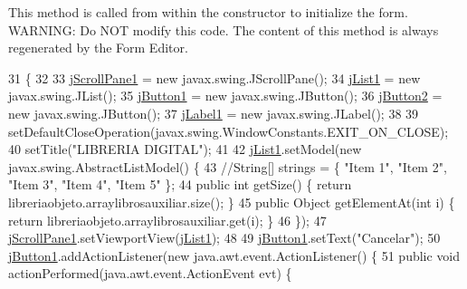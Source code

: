 This method is called from within the constructor to initialize the form. W\+A\+R\+N\+I\+NG\+: Do N\+OT modify this code. The content of this method is always regenerated by the Form Editor. 
\begin{DoxyCode}
31                                   \{
32 
33         \mbox{\hyperlink{class_interfaz_package_1_1_busqueda_libro_a2c5f99da1566043c6ead6bf6bc702bfa}{jScrollPane1}} = \textcolor{keyword}{new} javax.swing.JScrollPane();
34         \mbox{\hyperlink{class_interfaz_package_1_1_busqueda_libro_a44542e61409368d4f638e77765ab785f}{jList1}} = \textcolor{keyword}{new} javax.swing.JList();
35         \mbox{\hyperlink{class_interfaz_package_1_1_busqueda_libro_a8bd603a21b300bd0b31210ae9756c361}{jButton1}} = \textcolor{keyword}{new} javax.swing.JButton();
36         \mbox{\hyperlink{class_interfaz_package_1_1_busqueda_libro_a1cb7663746354ace608d7846c3d86105}{jButton2}} = \textcolor{keyword}{new} javax.swing.JButton();
37         \mbox{\hyperlink{class_interfaz_package_1_1_busqueda_libro_ae9603cba787d7c8cd78d9a35ac7c31ab}{jLabel1}} = \textcolor{keyword}{new} javax.swing.JLabel();
38 
39         setDefaultCloseOperation(javax.swing.WindowConstants.EXIT\_ON\_CLOSE);
40         setTitle(\textcolor{stringliteral}{"LIBRERIA DIGITAL"});
41 
42         \mbox{\hyperlink{class_interfaz_package_1_1_busqueda_libro_a44542e61409368d4f638e77765ab785f}{jList1}}.setModel(\textcolor{keyword}{new} javax.swing.AbstractListModel() \{
43             \textcolor{comment}{//String[] strings = \{ "Item 1", "Item 2", "Item 3", "Item 4", "Item 5" \};}
44             \textcolor{keyword}{public} \textcolor{keywordtype}{int} getSize() \{ \textcolor{keywordflow}{return} libreriaobjeto.arraylibrosauxiliar.size(); \}
45             \textcolor{keyword}{public} Object getElementAt(\textcolor{keywordtype}{int} i) \{ \textcolor{keywordflow}{return} libreriaobjeto.arraylibrosauxiliar.get(i); \}
46         \});
47         \mbox{\hyperlink{class_interfaz_package_1_1_busqueda_libro_a2c5f99da1566043c6ead6bf6bc702bfa}{jScrollPane1}}.setViewportView(\mbox{\hyperlink{class_interfaz_package_1_1_busqueda_libro_a44542e61409368d4f638e77765ab785f}{jList1}});
48 
49         \mbox{\hyperlink{class_interfaz_package_1_1_busqueda_libro_a8bd603a21b300bd0b31210ae9756c361}{jButton1}}.setText(\textcolor{stringliteral}{"Cancelar"});
50         \mbox{\hyperlink{class_interfaz_package_1_1_busqueda_libro_a8bd603a21b300bd0b31210ae9756c361}{jButton1}}.addActionListener(\textcolor{keyword}{new} java.awt.event.ActionListener() \{
51             \textcolor{keyword}{public} \textcolor{keywordtype}{void} actionPerformed(java.awt.event.ActionEvent evt) \{

\end{DoxyCode}

